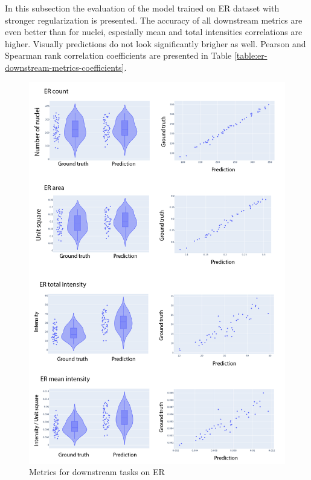 In this subsection the evaluation of the model trained on ER dataset with stronger regularization is presented. The accuracy of all downstream metrics are even better than for nuclei, espesially mean and total intensities correlations are higher. Visually predictions do not look significantly brigher as well. Pearson and Spearman rank correlation coefficients are presented in Table \ref{table:er-downstream-metrics-coefficients}.

\begin{figure}[htb]
	\begin{center}
		\includegraphics[width=\linewidth]{bilder/ER/metrics/combined-metrics.png}
		\caption{Metrics for downstream tasks on ER}\label{fig:er-downstream-metrics}
	\end{center}
\end{figure}

